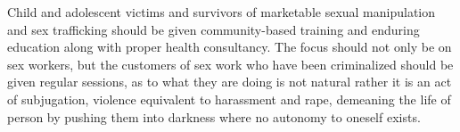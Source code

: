 \begin{multicols}{2}
\noi
Child and adolescent victims and survivors of marketable sexual manipulation and sex
trafficking should be given community-based training and enduring education along with
proper health consultancy. The focus should not only be on sex workers, but the customers of sex
work who have been criminalized should be given regular sessions, as to what they are doing
is not natural rather it is an act of subjugation, violence equivalent to harassment and rape,
demeaning the life of person by pushing them into darkness where no autonomy to oneself
exists.
\end{multicols}
	
\label{end2017-art3}
